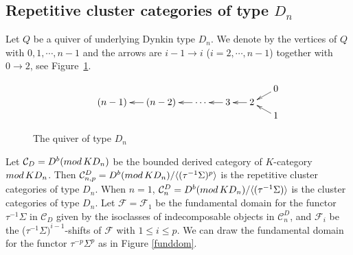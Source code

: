 \documentclass[a4paper,reqno,11pt]{amsart}
\theoremstyle{definition}
\def\C{\mathcal{C}}
\def\F{\mathcal{F}}
\renewcommand{\mod}{\mathop{\rm mod}\nolimits}%
\begin{document}
\subsection{Repetitive cluster categories of type $D_{n}$}
Let $Q$ be a quiver of underlying Dynkin type $D_n$. We denote by the vertices of $Q$ with $0,1,\cdots, n-1$ and the arrows are $i-1\rightarrow i$ ($i=2, \cdots , n-1$) together with $0\rightarrow 2$, see Figure~\ref{quiverdn}.
\begin{figure}[H]
\begin{center}
\[\xymatrix@R0pt@C14pt{
&&&&&& 0 \ar[dl]\\
& (n-1)
&(n-2)\ar[l]
&\cdots \ar[l]
&3\ar[l]
&2\ar[l]\\
&&&&&& 1\ar[lu].
}
\]
\caption{The quiver of type  $D_n$}
\label{quiverdn}
\end{center}
\end{figure}
\vspace{-2mm}
Let $\C_D=D^b(\mod KD_n)$ be the bounded derived category of $K$-category $\mod KD_n$. Then $\C_{n,p}^D=D^b(\mod KD_n)/\langle(\tau^{-1}\Sigma)^p\rangle$ is the repetitive cluster categories of type $D_n$. When $n=1$, $\C_{n}^D=D^b(\mod KD_n)/\langle(\tau^{-1}\Sigma)\rangle$ is the cluster categories of type $D_n$.
Let $\F=\F_1$ be the fundamental domain for the functor $\tau^{-1}\Sigma$ in $\C_D$ given by the isoclasses of indecomposable objects in $\C_n^D$, and $\F_i$ be the ($\tau^{-1}\Sigma)^{i-1}$-shifts of $\F$ with $1\leq i\leq p$. We can draw the fundamental domain for the functor $\tau^{-p}\Sigma^p$ as in Figure \ref{funddom}.
\end{document}
